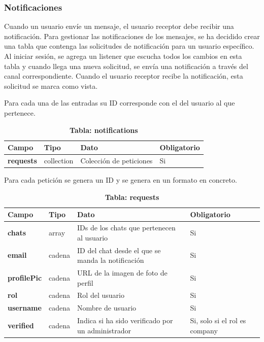 \documentclass[a4paper, 12pt]{article}
\begin{document}
\subsubsection{Notificaciones}

Cuando un usuario envíe un mensaje, el usuario receptor debe recibir una notificación. Para gestionar las notificaciones de los mensajes, se ha decidido crear una tabla que contenga las solicitudes de notificación para un usuario específico. Al iniciar sesión, se agrega un listener que escucha todos los cambios en esta tabla y cuando llega una nueva solicitud, se envía una notificación a través del canal correspondiente. Cuando el usuario receptor recibe la notificación, esta solicitud se marca como vista.

Para cada una de las entradas su ID corresponde con el del usuario al que pertenece.

\begin{table}[H]
\captionsetup{justification=raggedright,singlelinecheck=false}
\caption{\textbf{Tabla: notifications}}
\label{tab:notifications}
	\begin{tabular}{|m{3.2cm}|m{2cm}|m{5cm}|m{3cm}|}
	\hline
	\textbf{Campo} & \textbf{Tipo} & \textbf{Dato} & \textbf{Obligatorio} \\ 
	\hline
	\textbf{requests} & collection & Colección de peticiones & Si \\ 
	\hline
	\end{tabular}
\end{table}

Para cada petición se genera un ID y se genera en un formato en concreto.

\begin{table}[H]
\captionsetup{justification=raggedright,singlelinecheck=false}
\caption{\textbf{Tabla: requests}}
\label{tab:requests}
	\begin{tabular}{|m{3.2cm}|m{2cm}|m{5cm}|m{3cm}|}
	\hline
	\textbf{Campo} & \textbf{Tipo} & \textbf{Dato} & \textbf{Obligatorio} \\ 
	\hline
	\textbf{chats} & array & IDs de los chats que pertenecen al usuario & Si \\ 
	\hline
	\textbf{email} & cadena &  ID del chat desde el que se manda la notificación & Si \\ 
	\hline
	\textbf{profilePic} & cadena & URL de la imagen de foto de perfil & Si \\ 
	\hline
	\textbf{rol} & cadena & Rol del usuario & Si \\ 
	\hline
	\textbf{username} & cadena & Nombre de usuario & Si \\ 
	\hline
	\textbf{verified} & cadena & Indica si ha sido verificado por un administrador & Si, solo si el rol es company \\ 
	\hline
	\end{tabular}
\end{table}
\end{document}

